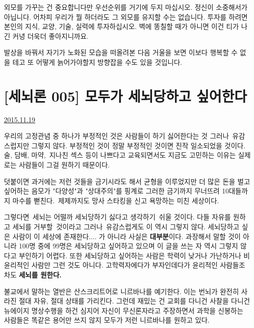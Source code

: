 외모를 가꾸는 건 중요합니다만 우선순위를 거기에 두지 마십시오.
정신이 소중해서가 아닙니다. 어차피 우리가 뭘 하더라도 그 외모를 유지할 수는 없습니다.
투자를 하려면 본인의 지식, 교양, 기술, 실력에 투자하십시오. 벽에 똥칠할 때가 아니면 이건 티가 나긴 커녕 더욱더 좋아지니까요.
\vspace{5mm}

발상을 바꿔서 자기가 노화된 모습을 떠올려본 다음 거울을 보면 이보다 행복할 수 없을 테고
또 어떻게 늙어가야할지 방향잡을 수도 있을 것입니다.
\vspace{5mm}



\section{[세뇌론 005] 모두가 세뇌당하고 싶어한다}
\href{https://www.kockoc.com/Apoc/499770}{2015.11.19}

\vspace{5mm}

우리의 고정관념 중 하나가 부정적인 것은 사람들이 하기 싫어한다는 것
그러나 유감스럽지만 그렇지 않다. 부정적인 것이 정말 부정적인 것이면 진작 일소되었을 것이다.
술, 담배, 마약, 지나친 섹스 등이 나쁘다고 교육되면서도 지금도 고민하는 이유는 실제로는 사람들이 그걸 원하기 때문이다.
\vspace{5mm}

덧붙이면 과거에는 저런 것들을 금기시라도 해서 균형을 이루었지만
더 많은 돈을 벌고 싶어하는 음모가 "다양성"과 "상대주의"를 핑계로 그러한 금기까지 무너뜨려
10대들까지 마수를 뻗친다. 제제까지도 망사 스타킹을 신고 욕망하는 미친 세상이다.
\vspace{5mm}

그렇다면 세뇌는 어떨까
세뇌당하기 싫다고 생각하기 쉬울 것이다. 다들 자유를 원하고 세뇌를 거부할 것이라고
그러나 유감스럽게도 이 역시 그렇지 않다.
세뇌당하고 싶은 사람이 이 세상에 존재한다.... 가 아니라 사실은 \textbf{대부분}이다.
과장해서 말할 것이 아니라 100명 중에 99명은 세뇌당하고 싶어하고 있으며 이 글을 쓰는 자 역시 그렇지 않다고 부인하기 어렵다.
또한 세뇌당하고 싶어하는 사람은 학력이 낮거나 가난하거나 비윤리적인 사람만 그런 것도 아니다.
고학력자에다가 부자인데다가 윤리적인 사람들조차도 \textbf{세뇌를 원한다.}
\vspace{5mm}

불교에서 말하는 열반은 산스크리트어로 니르바나를 예기한다.
이는 번뇌가 완전히 사라진 절대 자유, 절대 상태를 가리킨다.
그런데 재밌는 건 교회를 다니건 사찰을 다니건 뉴에이지 명상수행을 하건
심지어 자신이 무신론자라고 주장하면서 과학을 신봉하는 사람들은 똑같은 용어만 쓰지 않지
모두가 저런 니르바나를 원하고 있다.
\vspace{5mm}

